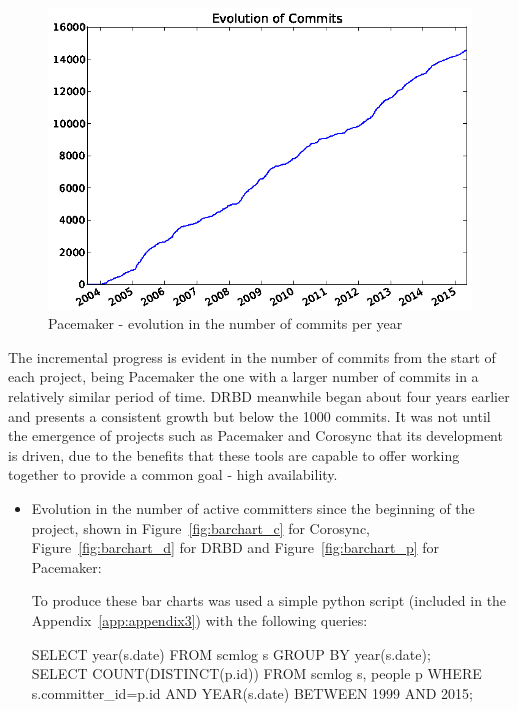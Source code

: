 \documentclass[a4paper, 12pt]{book}
\begin{document}
    \begin{figure}[H]
      \centering
      \includegraphics[scale=0.50]{fig8-6.png}
      \caption[Evolution in the number of commits for Pacemaker]{Pacemaker - evolution in the number of commits per year}
      \label{fig:fig8-6}
    \end{figure}

    
\noindent The incremental progress is evident in the number of commits from the start of each project, being Pacemaker the one with a larger number of commits in a relatively similar period of time. DRBD meanwhile began about four years earlier and presents a consistent growth but below the 1000 commits. It was not until the emergence of projects such as Pacemaker and Corosync that its development is driven, due to the benefits that these tools are capable to offer working together to provide a common goal - high availability.


\begin{itemize}
      \item Evolution in the number of active committers since the beginning of the project, shown in Figure~\ref{fig:barchart_c} for Corosync, Figure~\ref{fig:barchart_d} for DRBD and Figure~\ref{fig:barchart_p} for Pacemaker:

      To produce these bar charts was used a simple python script (included in the Appendix~\ref{app:appendix3}) with the following queries:
      
      SELECT year(s.date) FROM scmlog s GROUP BY year(s.date);\\
      SELECT COUNT(DISTINCT(p.id)) FROM scmlog s, people p WHERE s.committer\_id=p.id AND YEAR(s.date) BETWEEN 1999 AND 2015;
\end{itemize}
\end{document}
